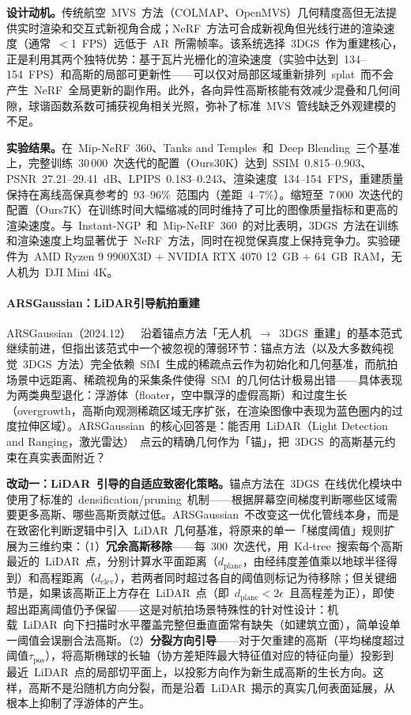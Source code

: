\textbf{设计动机。}传统航空~MVS~方法（COLMAP、OpenMVS）几何精度高但无法提供实时渲染和交互式新视角合成；NeRF~方法可合成新视角但光线行进的渲染速度（通常~$<$1~FPS）远低于~AR~所需帧率。该系统选择~3DGS~作为重建核心，正是利用其两个独特优势：基于瓦片光栅化的渲染速度（实验中达到~134--154~FPS）和高斯的局部可更新性——可以仅对局部区域重新排列~splat~而不会产生~NeRF~全局更新的副作用。此外，各向异性高斯核能有效减少混叠和几何间隙，球谐函数系数可捕获视角相关光照，弥补了标准~MVS~管线缺乏外观建模的不足。

\textbf{实验结果。}在~Mip-NeRF~360、Tanks and Temples~和~Deep Blending~三个基准上，完整训练~30\,000~次迭代的配置（Ours30K）达到~SSIM~0.815--0.903、PSNR~27.21--29.41~dB、LPIPS~0.183--0.243、渲染速度~134--154~FPS，重建质量保持在离线高保真参考的~93--96\%~范围内（差距~4--7\%）。缩短至~7\,000~次迭代的配置（Ours7K）在训练时间大幅缩减的同时维持了可比的图像质量指标和更高的渲染速度。与~Instant-NGP~和~Mip-NeRF~360~的对比表明，3DGS~方法在训练和渲染速度上均显著优于~NeRF~方法，同时在视觉保真度上保持竞争力。实验硬件为~AMD Ryzen 9 9900X3D + NVIDIA RTX 4070 12~GB + 64~GB~RAM，无人机为~DJI Mini 4K。

\paragraph{ARSGaussian：LiDAR引导航拍重建}

ARSGaussian（2024.12）~\cite{2412_18380} 沿着锚点方法「无人机~$\to$~3DGS~重建」的基本范式继续前进，但指出该范式中一个被忽视的薄弱环节：锚点方法（以及大多数纯视觉~3DGS~方法）完全依赖~SfM~生成的稀疏点云作为初始化和几何基准，而航拍场景中远距离、稀疏视角的采集条件使得~SfM~的几何估计极易出错——具体表现为两类典型退化：浮游体（floater，空中飘浮的虚假高斯）和过度生长（overgrowth，高斯向观测稀疏区域无序扩张，在渲染图像中表现为蓝色圈内的过度拉伸区域）。ARSGaussian~的核心回答是：能否用~LiDAR（Light Detection and Ranging，激光雷达）~点云的精确几何作为「锚」，把~3DGS~的高斯基元约束在真实表面附近？

\textbf{改动一：LiDAR~引导的自适应致密化策略。}锚点方法在~3DGS~在线优化模块中使用了标准的~densification/pruning~机制——根据屏幕空间梯度判断哪些区域需要更多高斯、哪些高斯贡献过低。ARSGaussian~不改变这一优化管线本身，而是在致密化判断逻辑中引入~LiDAR~几何基准，将原来的单一「梯度阈值」规则扩展为三维约束：（1）\textbf{冗余高斯移除}——每~300~次迭代，用~Kd-tree~搜索每个高斯最近的~LiDAR~点，分别计算水平面距离（$d_{\text{plane}}$，由经纬度差值乘以地球半径得到）和高程距离（$d_{\text{elev}}$），若两者同时超过各自的阈值则标记为待移除；但关键细节是，如果该高斯正上方存在~LiDAR~点（即~$d_{\text{plane}} < 2\epsilon$~且高程差为正），即使超出距离阈值仍予保留——这是对航拍场景特殊性的针对性设计：机载~LiDAR~向下扫描时水平覆盖完整但垂直面常有缺失（如建筑立面），简单设单一阈值会误删合法高斯。（2）\textbf{分裂方向引导}——对于欠重建的高斯（平均梯度超过阈值$\tau_{\text{pos}}$），将高斯椭球的长轴（协方差矩阵最大特征值对应的特征向量）投影到最近~LiDAR~点的局部切平面上，以投影方向作为新生成高斯的生长方向。这样，高斯不是沿随机方向分裂，而是沿着~LiDAR~揭示的真实几何表面延展，从根本上抑制了浮游体的产生。

